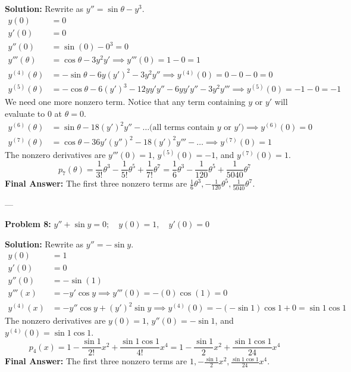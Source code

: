 \documentclass[11pt, letterpaper]{article}
\theoremstyle{definition}
\theoremstyle{remark}
\begin{document}
\textbf{Solution:}
Rewrite as $y'' = \sin\theta - y^3$.
\begin{align*}
    y(0) &= 0 \\
    y'(0) &= 0 \\
    y''(0) &= \sin(0) - 0^3 = 0 \\
    y'''(\theta) &= \cos\theta - 3y^2 y' \implies y'''(0) = 1 - 0 = 1 \\
    y^{(4)}(\theta) &= -\sin\theta - 6y(y')^2 - 3y^2 y'' \implies y^{(4)}(0) = 0 - 0 - 0 = 0 \\
    y^{(5)}(\theta) &= -\cos\theta - 6(y')^3 - 12yy'y'' - 6yy'y'' - 3y^2 y''' \implies y^{(5)}(0) = -1 - 0 = -1
\end{align*}
We need one more nonzero term. Notice that any term containing $y$ or $y'$ will evaluate to 0 at $\theta=0$.
\begin{align*}
    y^{(6)}(\theta) &= \sin\theta - 18(y')^2 y'' - \dots \text{(all terms contain } y \text{ or } y') \implies y^{(6)}(0) = 0 \\
    y^{(7)}(\theta) &= \cos\theta - 36y'(y'')^2 - 18(y')^2 y''' - \dots \implies y^{(7)}(0) = 1
\end{align*}
The nonzero derivatives are $y'''(0)=1$, $y^{(5)}(0)=-1$, and $y^{(7)}(0)=1$.
\[ p_7(\theta) = \frac{1}{3!}\theta^3 - \frac{1}{5!}\theta^5 + \frac{1}{7!}\theta^7 = \frac{1}{6}\theta^3 - \frac{1}{120}\theta^5 + \frac{1}{5040}\theta^7 \]
\textbf{Final Answer:} The first three nonzero terms are $\frac{1}{6}\theta^3, -\frac{1}{120}\theta^5, \frac{1}{5040}\theta^7$.

---

\textbf{Problem 8:} $y'' + \sin y = 0 ; \quad y(0) = 1 , \quad y'(0) = 0$

\textbf{Solution:}
Rewrite as $y'' = -\sin y$.
\begin{align*}
    y(0) &= 1 \\
    y'(0) &= 0 \\
    y''(0) &= -\sin(1) \\
    y'''(x) &= -y'\cos y \implies y'''(0) = -(0)\cos(1) = 0 \\
    y^{(4)}(x) &= -y''\cos y + (y')^2\sin y \implies y^{(4)}(0) = -(-\sin 1)\cos 1 + 0 = \sin 1 \cos 1
\end{align*}
The nonzero derivatives are $y(0)=1$, $y''(0)=-\sin 1$, and $y^{(4)}(0)=\sin 1 \cos 1$.
\[ p_4(x) = 1 - \frac{\sin 1}{2!}x^2 + \frac{\sin 1 \cos 1}{4!}x^4 = 1 - \frac{\sin 1}{2}x^2 + \frac{\sin 1 \cos 1}{24}x^4 \]
\textbf{Final Answer:} The first three nonzero terms are $1, -\frac{\sin 1}{2}x^2, \frac{\sin 1 \cos 1}{24}x^4$.
\end{document}
